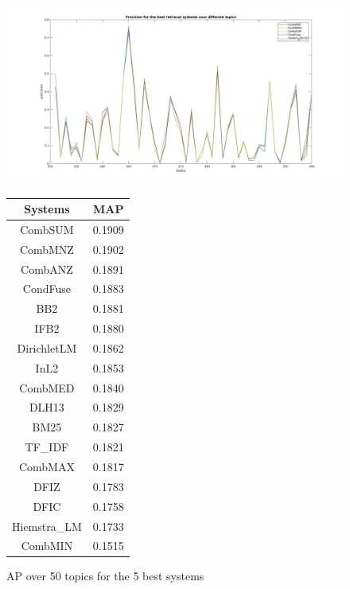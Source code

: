 {	\begin{figure}[H]
		\begin{minipage}{0.7\textwidth}				
			\includegraphics[width=\linewidth]{../eval/results-img-graphs/top5.jpg}
			\caption{AP over 50 topics for the 5 best systems}
			\label{fig:top5AP}
		\end{minipage}
		\begin{minipage}{0.3\textwidth}
			\begin{tabular}{c c}
					\toprule
					\textbf{Systems} & \textbf{MAP}\\ \toprule
					CombSUM & 0.1909 \\
					CombMNZ & 0.1902 \\
					CombANZ & 0.1891 \\
					CondFuse & 0.1883 \\
					BB2 & 0.1881 \\
					IFB2 & 0.1880 \\					
					DirichletLM & 0.1862 \\
					InL2 & 0.1853 \\
					CombMED & 0.1840 \\
					DLH13 & 0.1829 \\				
					BM25 & 0.1827 \\
					TF\_IDF & 0.1821\\
					CombMAX & 0.1817 \\
					DFIZ & 0.1783 \\					
					DFIC & 0.1758 \\				
					Hiemstra\_LM & 0.1733 \\
					CombMIN & 0.1515 \\							
					\bottomrule
				\end{tabular}
			\label{tab:17SysMAP}
		\end{minipage}			
	\end{figure}

}
